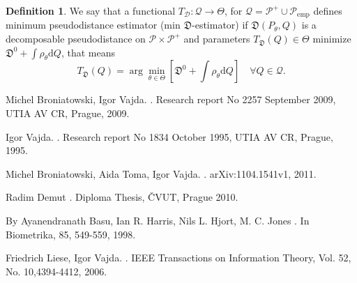 \documentclass[11pt,a4paper]{article}
\theoremstyle{definition}
\newtheorem{definition}{Definition}[section]
\begin{document}
\begin{definition}
	We say that a functional $T_\mathcal{D}:\mathcal{Q} \rightarrow \Theta$, for $\mathcal{Q}=\mathcal{P}^+ \cup \mathcal{P}_{\text{emp}}$	defines minimum pseudodistance estimator (min $\mathfrak{D}$-estimator) if $\mathfrak{D}(P_\theta,Q)$ is a decomposable pseudodistance on $\mathcal{P}\times\mathcal{P}^+$ and parameters $T_\mathfrak{D}(Q) \in \Theta$ minimize $\mathfrak{D}^0 + \int{\rho_\theta}\mathrm{d}Q$, that means
	\begin{equation}
		T_\mathfrak{D}(Q) = \arg\min_{\theta \in \Theta} \left[ \mathfrak{D}^0 + \int{\rho_\theta}\mathrm{d}Q \right] \quad \forall Q \in \mathcal{Q}.
	\end{equation}
\end{definition}







\pagebreak

\begin{thebibliography}{99.}

Michel Broniatowski, Igor Vajda.
.
\newblock Research report No 2257 September 2009, UTIA AV CR, Prague, 2009.

Igor Vajda.
.
\newblock Research report No 1834 October 1995, UTIA AV CR, Prague, 1995.

Michel Broniatowski, Aida Toma, Igor Vajda.
.
\newblock arXiv:1104.1541v1, 2011.

Radim Demut
.
\newblock Diploma Thesis, ČVUT, Prague 2010.

By Ayanendranath Basu, Ian R. Harris, Nils L. Hjort, M. C. Jones
.
\newblock In Biometrika, 85, 549-559, 1998.

Friedrich Liese, Igor Vajda.
.
\newblock IEEE Transactions on Information Theory, Vol. 52, No. 10,4394-4412, 2006.

\end{thebibliography}
\end{document}
